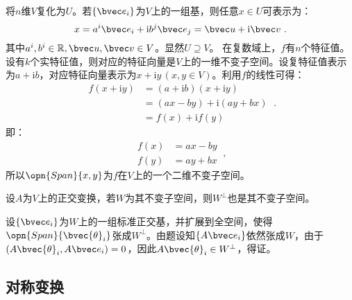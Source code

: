 将$n$维$V$复化为$U$。若$\{\bvec e_i\}$为$V$上的一组基，则任意$x\in U$可表示为：
\begin{equation}
x=a^i\bvec e_i+\mathrm i b^j\bvec e_j=\bvec u+\mathrm i\bvec v~.
\end{equation}
其中$a^i,b^i\in \mathbb R,\bvec u,\bvec v\in V$。显然$U\supseteq V$。
在复数域上，$f$有$n$个特征值。设有$k$个实特征值，则对应的特征向量是$V$上的一维不变子空间。设复特征值表示为$a+\mathrm ib$，对应特征向量表示为$x+\mathrm i y\,(x,y\in V)$。利用$f$的线性可得：
\begin{equation}
\begin{aligned}
f(x+\mathrm i y)&=(a+\mathrm i b)(x+\mathrm i y)\\
&=(ax-by)+\mathrm i(ay+bx)\\
&=f(x)+\mathrm if(y)
\end{aligned}~.
\end{equation}
即：
\begin{equation}
\begin{aligned}
f(x)&=ax-by\\
f(y)&=ay+bx
\end{aligned}~,
\end{equation}
所以$\opn{Span}\{x,y\}$为$f$在$V$上的一个二维不变子空间。
\begin{theorem}{}
设$A$为$V$上的正交变换，若$W$为其不变子空间，则$W^{\bot}$也是其不变子空间。
\end{theorem}
设$\{\bvec e_i\}$为$W$上的一组标准正交基，并扩展到全空间，使得$\opn{Span}\{\bvec {\theta}_i\}$张成$W^{\bot}$。由题设知$\{A\bvec e_i\}$依然张成$W$，由于$(A\bvec {\theta}_i,A\bvec e_i)=0$，因此$A\bvec{\theta}_i\in W^{\bot}$，得证。

\subsection{对称变换}


